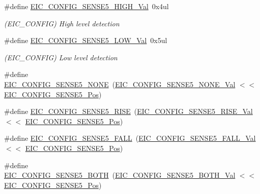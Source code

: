 \begin{DoxyCompactItemize}
\#define \mbox{\hyperlink{group___s_a_m_d21___e_i_c_gafc521f838a152ea846c8ba29d2d7e578}{E\+I\+C\+\_\+\+C\+O\+N\+F\+I\+G\+\_\+\+S\+E\+N\+S\+E5\+\_\+\+H\+I\+G\+H\+\_\+\+Val}}~0x4ul
\begin{DoxyCompactList}\small\item\em (E\+I\+C\+\_\+\+C\+O\+N\+F\+IG) High level detection \end{DoxyCompactList}\item 
\#define \mbox{\hyperlink{group___s_a_m_d21___e_i_c_ga4a2958b65315240e85c9bf06c9c92305}{E\+I\+C\+\_\+\+C\+O\+N\+F\+I\+G\+\_\+\+S\+E\+N\+S\+E5\+\_\+\+L\+O\+W\+\_\+\+Val}}~0x5ul
\begin{DoxyCompactList}\small\item\em (E\+I\+C\+\_\+\+C\+O\+N\+F\+IG) Low level detection \end{DoxyCompactList}\item 
\#define \mbox{\hyperlink{group___s_a_m_d21___e_i_c_ga9de75fb4e0ca1290179613d6bcb55631}{E\+I\+C\+\_\+\+C\+O\+N\+F\+I\+G\+\_\+\+S\+E\+N\+S\+E5\+\_\+\+N\+O\+NE}}~(\mbox{\hyperlink{group___s_a_m_d21___e_i_c_ga1f73b11cdad345f444d6267c016e7d06}{E\+I\+C\+\_\+\+C\+O\+N\+F\+I\+G\+\_\+\+S\+E\+N\+S\+E5\+\_\+\+N\+O\+N\+E\+\_\+\+Val}}    $<$$<$ \mbox{\hyperlink{group___s_a_m_d21___e_i_c_gace7caae074bf08e88805b591c626fb7f}{E\+I\+C\+\_\+\+C\+O\+N\+F\+I\+G\+\_\+\+S\+E\+N\+S\+E5\+\_\+\+Pos}})
\item 
\#define \mbox{\hyperlink{group___s_a_m_d21___e_i_c_gac0a8b0ca8b52ba680ded94efc88f3c4f}{E\+I\+C\+\_\+\+C\+O\+N\+F\+I\+G\+\_\+\+S\+E\+N\+S\+E5\+\_\+\+R\+I\+SE}}~(\mbox{\hyperlink{group___s_a_m_d21___e_i_c_gaa79135e0c433132db7b3df88472fda74}{E\+I\+C\+\_\+\+C\+O\+N\+F\+I\+G\+\_\+\+S\+E\+N\+S\+E5\+\_\+\+R\+I\+S\+E\+\_\+\+Val}}    $<$$<$ \mbox{\hyperlink{group___s_a_m_d21___e_i_c_gace7caae074bf08e88805b591c626fb7f}{E\+I\+C\+\_\+\+C\+O\+N\+F\+I\+G\+\_\+\+S\+E\+N\+S\+E5\+\_\+\+Pos}})
\item 
\#define \mbox{\hyperlink{group___s_a_m_d21___e_i_c_ga2bed9ee5946a92d537ab465bba113860}{E\+I\+C\+\_\+\+C\+O\+N\+F\+I\+G\+\_\+\+S\+E\+N\+S\+E5\+\_\+\+F\+A\+LL}}~(\mbox{\hyperlink{group___s_a_m_d21___e_i_c_ga2f575e054321eef78315a123006b62dc}{E\+I\+C\+\_\+\+C\+O\+N\+F\+I\+G\+\_\+\+S\+E\+N\+S\+E5\+\_\+\+F\+A\+L\+L\+\_\+\+Val}}    $<$$<$ \mbox{\hyperlink{group___s_a_m_d21___e_i_c_gace7caae074bf08e88805b591c626fb7f}{E\+I\+C\+\_\+\+C\+O\+N\+F\+I\+G\+\_\+\+S\+E\+N\+S\+E5\+\_\+\+Pos}})
\item 
\#define \mbox{\hyperlink{group___s_a_m_d21___e_i_c_ga4b3ac1d5fdffe8ace39887ccabede68b}{E\+I\+C\+\_\+\+C\+O\+N\+F\+I\+G\+\_\+\+S\+E\+N\+S\+E5\+\_\+\+B\+O\+TH}}~(\mbox{\hyperlink{group___s_a_m_d21___e_i_c_ga020047d3418afa7b60b72bfc4872bfb0}{E\+I\+C\+\_\+\+C\+O\+N\+F\+I\+G\+\_\+\+S\+E\+N\+S\+E5\+\_\+\+B\+O\+T\+H\+\_\+\+Val}}    $<$$<$ \mbox{\hyperlink{group___s_a_m_d21___e_i_c_gace7caae074bf08e88805b591c626fb7f}{E\+I\+C\+\_\+\+C\+O\+N\+F\+I\+G\+\_\+\+S\+E\+N\+S\+E5\+\_\+\+Pos}})

\end{DoxyCompactItemize}
